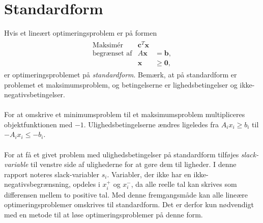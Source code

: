 \section{Standardform}
\label{sec:standard}
% 
Hvis et lineært optimeringsproblem er på formen
%
\begin{align*}
\begin{array}{lrl}
\text{Maksimér}		&\textbf{c}^T\textbf{x}	&				\\
\text{begrænset af}	&A\textbf{x}	&=\mathbf{b},	\\
					&\mathbf{x}				&\geq \mathbf{0},
\end{array}
\end{align*}
%
er optimeringsproblemet på \textit{standardform}.
Bemærk, at på standardform er problemet et maksimumsproblem, og betingelserne er lighedsbetingelser og ikke-negativsbetingelser.
\\\\
%
For at omskrive et minimumsproblem til et maksimumsproblem multipliceres objektfunktionen med $-1$.
Ulighedsbetingelserne ændres ligeledes fra $A_ix_i \geq b_i$ til $-A_ix_i \leq -b_i$.
\\\\
For at få et givet problem med ulighedsbetingelser på standardform tilføjes \textit{slack-variable} til venstre side af ulighederne for at gøre dem til ligheder.
I denne rapport noteres slack-variabler $s_i$.
Variabler, der ikke har en ikke-negativsbegrænsning, opdeles i $x_i^+$ og $x_i^-$, da alle reelle tal kan skrives som differensen mellem to positive tal.
Med denne fremgangsmåde kan alle lineære optimeringsproblemer omskrives til standardform.
Det er derfor kun nødvendigt med en metode til at løse optimeringsproblemer på denne form.
%


